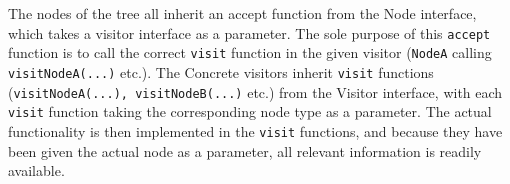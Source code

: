 The nodes of the tree all inherit an accept function from the Node interface, which
takes a visitor interface as a parameter. The sole purpose of this \texttt{accept}
function is to call the correct \texttt{visit} function in the given visitor
(\texttt{NodeA} calling \texttt{visitNodeA(...)} etc.). The Concrete visitors inherit
\texttt{visit} functions (\texttt{visitNodeA(...), visitNodeB(...)} etc.) from the
Visitor interface, with each \texttt{visit} function taking the corresponding node
type as a parameter. The actual functionality is then implemented in the
\texttt{visit} functions, and because they have been given the actual node as a
parameter, all relevant information is readily available.
